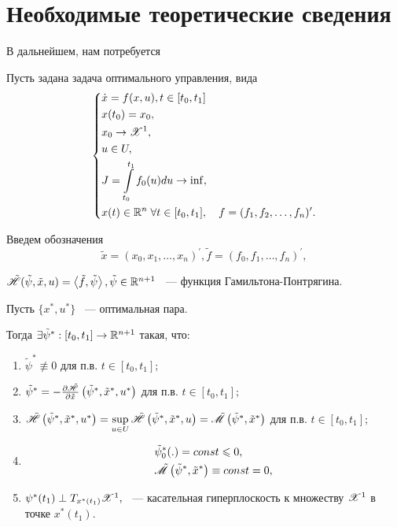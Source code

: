 \documentclass[10pt,pdf,hyperref={unicode}]{beamer}
\begin{document}
	\section{Необходимые теоретические сведения}
	В дальнейшем, нам потребуется
	\begin{theorem}
	Пусть задана задача оптимального управления, вида
	\begin{equation}\label{mainSystem}
	\left\{
		\begin{aligned}
		& \dot x = f(x, u),  t \in \left[t_0, t_1\right]\\
		& x(t_0) = x_0,\\
		& x_0 \rightarrow {\mathscr{X}} ^ 1, \\
		& u \in U, \\
		& J = \int \limits ^{t_1}_{t_0} f_0(u) du \rightarrow \inf ,\\
		& x(t) \in \mathbb{R} ^n \;\forall t \in [t_0, t_1], \quad f = (f_1, f_2, \dots , f_n) ^\prime .\\
		\end{aligned}
	\right.
	\end{equation}
	
	Введем обозначения 
	\[
	\tilde x = (x_0, x_1, \dots, x_n) ^\prime, \tilde f = (f_0, f_1, \dots , f_n) ^\prime,
	\]
	
	\( \tilde {{\mathscr{H}}} (\tilde \psi, \tilde x, u)  = \left<\tilde f,\tilde \psi\right>, \tilde \psi \in \mathbb{R}^{n+1}\) ~--- функция Гамильтона-Понтрягина.
	
	Пусть \(  \{x^*, u^*\}  \) ~--- оптимальная пара. 
	
	Тогда \(\exists \tilde \psi ^ * : [t_0, t_1] \rightarrow \mathbb{R}^{n+1}\) такая, что:
	\begin{enumerate}
	\item \(\tilde \psi ^ * \not\equiv 0   \)  для п.в. \(t \in [t_0, t_1];\)
	\item \( \tilde \psi ^ * = -\frac{\partial \tilde {{\mathscr{H}}}}{\partial \tilde x} \left(\tilde \psi ^ *,  \tilde x^*, u^*  \right)  \) 
		для п.в. \(t \in [t_0, t_1];\)
	\item \(  \tilde {{\mathscr{H}}} \left(\tilde \psi ^ *,  \tilde x^*, u^*  \right) = 
		\sup \limits_{u \in U} \tilde {{\mathscr{H}}} \left(\tilde \psi ^ *,  \tilde x^*, u  \right) = 
		\tilde {{\mathscr{M}}} \left( \tilde \psi ^ *,  \tilde x^* \right)\) для п.в. \(t \in [t_0, t_1];\)  
	\item
		\[
		\begin{aligned}
		&\tilde \psi^*_0 (.) = const \leqslant 0,\\
		&\tilde {{\mathscr{M}}} \left( \tilde \psi ^ *,  \tilde x^* \right) \equiv const = 0,\\
		\end{aligned}
		\] 
	\item \(\psi^*(t_1) \perp T_{x^*(t_1)} {\mathscr{X}}^1,\)  ~--- касательная гиперплоскость к множеству ${\mathscr{X}}^1$ в точке $x^*(t_1).$
	\end{enumerate}
	\end{theorem}
\end{document}
